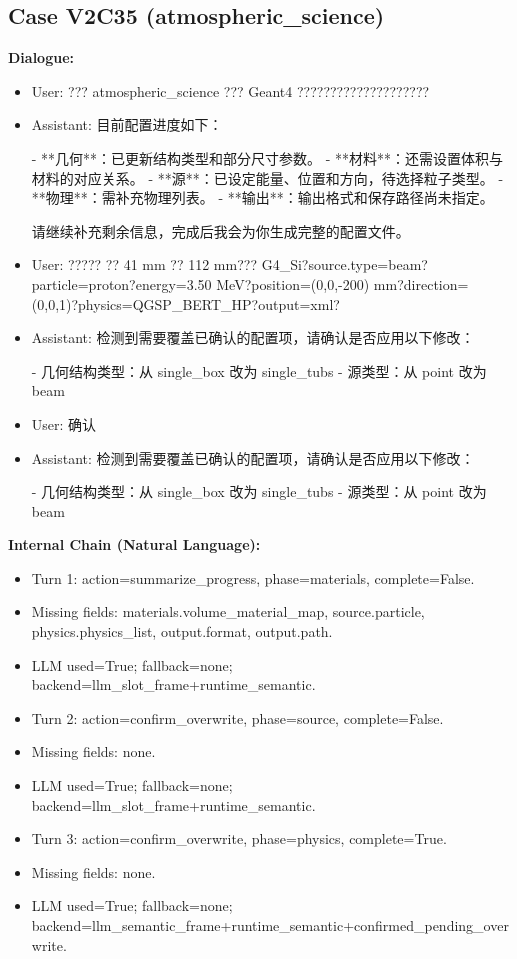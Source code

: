 \documentclass[11pt]{ctexart}
\begin{document}
\subsection{Case V2C35 (atmospheric\_science)}
\textbf{Dialogue:}
\begin{itemize}
\item User: ??? atmospheric\_science ??? Geant4 ????????????????????
\item Assistant: 目前配置进度如下：

- **几何**：已更新结构类型和部分尺寸参数。
- **材料**：还需设置体积与材料的对应关系。
- **源**：已设定能量、位置和方向，待选择粒子类型。
- **物理**：需补充物理列表。
- **输出**：输出格式和保存路径尚未指定。

请继续补充剩余信息，完成后我会为你生成完整的配置文件。
\item User: ????? ?? 41 mm ?? 112 mm??? G4\_Si?source.type=beam?particle=proton?energy=3.50 MeV?position=(0,0,-200) mm?direction=(0,0,1)?physics=QGSP\_BERT\_HP?output=xml?
\item Assistant: 检测到需要覆盖已确认的配置项，请确认是否应用以下修改：

- 几何结构类型：从 single\_box 改为 single\_tubs
- 源类型：从 point 改为 beam
\item User: 确认
\item Assistant: 检测到需要覆盖已确认的配置项，请确认是否应用以下修改：

- 几何结构类型：从 single\_box 改为 single\_tubs
- 源类型：从 point 改为 beam
\end{itemize}
\textbf{Internal Chain (Natural Language):}
\begin{itemize}
\item Turn 1: action=summarize\_progress, phase=materials, complete=False.
\item Missing fields: materials.volume\_material\_map, source.particle, physics.physics\_list, output.format, output.path.
\item LLM used=True; fallback=none; backend=llm\_slot\_frame+runtime\_semantic.
\item Turn 2: action=confirm\_overwrite, phase=source, complete=False.
\item Missing fields: none.
\item LLM used=True; fallback=none; backend=llm\_slot\_frame+runtime\_semantic.
\item Turn 3: action=confirm\_overwrite, phase=physics, complete=True.
\item Missing fields: none.
\item LLM used=True; fallback=none; backend=llm\_semantic\_frame+runtime\_semantic+confirmed\_pending\_overwrite.
\end{itemize}
\end{document}
